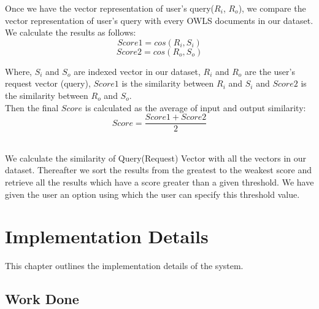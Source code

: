 \documentclass[12pt, twoside]{book}
\begin{document}
Once we have the vector representation of user's query($R_{i}$, $R_{o}$), we compare the vector representation of user's query with every OWLS documents in our dataset. We calculate the results as follows:
\vspace{2pt}
\begin{equation}
 Score1 = cos(R_{i}, S_{i})
\end{equation}
\begin{equation}
 Score2 = cos(R_{o}, S_{o})
\end{equation}
\vspace{2pt}
\par
Where, $S_{i}$ and $S_{o}$ are indexed vector in our dataset, $R_{i}$ and $R_{o}$ are the user's request vector (query), $Score1$ is the similarity between $R_{i}$ and $S_{i}$ and $Score2$ is the similarity between $R_{o}$ and $S_{o}$. \\
Then the final $Score$ is calculated as the average of input and output similarity: \\
\begin{equation}
 Score = \frac{Score1 + Score 2}{2}
\end{equation}
\\ \par
We calculate the similarity of Query(Request) Vector with all the vectors in our dataset. Thereafter we sort the results from the greatest to the weakest score and retrieve all the results which have a score greater than a given threshold. We have given the user an option using which the user can specify this threshold value.

\chapter{Implementation Details}
This chapter outlines the implementation details of the system.
\section{Work Done}
\end{document}
